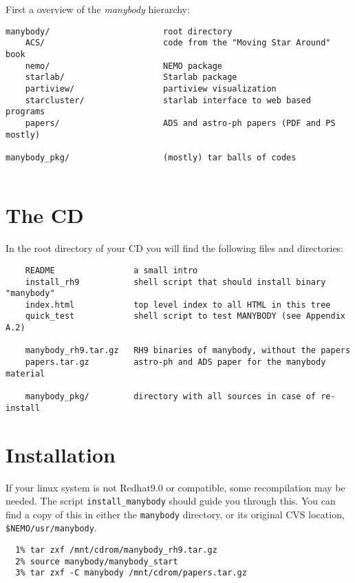 First a overview of the {\it manybody} hierarchy:

\begin{verbatim}
manybody/                       root directory
    ACS/                        code from the "Moving Star Around" book
    nemo/                       NEMO package
    starlab/                    Starlab package
    partiview/                  partiview visualization 
    starcluster/                starlab interface to web based programs
    papers/                     ADS and astro-ph papers (PDF and PS mostly)

manybody_pkg/                   (mostly) tar balls of codes 
    
\end{verbatim}



\section{The CD}
In the root directory of your CD you will find the following files and directories:

\begin{verbatim}
    README                a small intro
    install_rh9           shell script that should install binary "manybody"
    index.html            top level index to all HTML in this tree
    quick_test            shell script to test MANYBODY (see Appendix A.2)

    manybody_rh9.tar.gz   RH9 binaries of manybody, without the papers
    papers.tar.gz         astro-ph and ADS paper for the manybody material

    manybody_pkg/         directory with all sources in case of re-install
\end{verbatim}

\section{Installation}

If your linux system is not Redhat9.0
or compatible, some recompilation may be needed. The script
{\tt install\_manybody} should guide you through this. You can find a copy
of this in either the {\tt manybody} directory, or its original CVS location,
{\tt \$NEMO/usr/manybody}.

\footnotesize\begin{verbatim}
  1% tar zxf /mnt/cdrom/manybody_rh9.tar.gz
  2% source manybody/manybody_start
  3% tar zxf -C manybody /mnt/cdrom/papers.tar.gz

\end{verbatim}\normalsize

